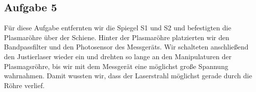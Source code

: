 \subsection{Aufgabe 5}

Für diese Aufgabe entfernten wir die Spiegel S1 und S2 und befestigten die Plasmaröhre über der Schiene. Hinter der Plasmaröhre platzierten wir den Bandpassfilter und den Photosensor des Messgeräts. Wir schalteten anschließend den Justierlaser wieder ein und drehten so lange an den Manipulaturen der Plasmagsröhre, bis wir mit dem Messgerät eine möglichst große Spannung wahrnahmen. Damit wussten wir, dass der Laserstrahl möglichst gerade durch die Röhre verlief.\\
